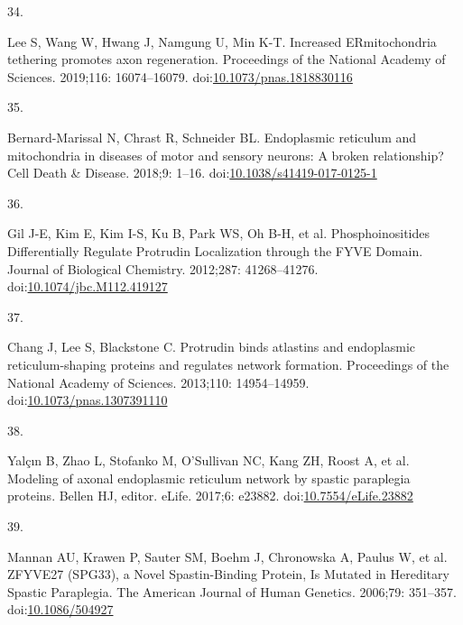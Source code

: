 \documentclass[
  12pt,
  a4paper,
]{book}
\newlength{\cslhangindent}
\newlength{\csllabelwidth}
\newlength{\cslentryspacingunit} %
\newenvironment{CSLReferences}[2] %
 {%
  \setlength{\parindent}{0pt}
  \ifodd #1
  \let\oldpar\par
  \def\par{\hangindent=\cslhangindent\oldpar}
  \fi
  \setlength{\parskip}{#2\cslentryspacingunit}
 }%
 {}
\newcommand{\CSLLeftMargin}[1]{\parbox[t]{\csllabelwidth}{#1}}
\newcommand{\CSLRightInline}[1]{\parbox[t]{\linewidth - \csllabelwidth}{#1}\break}
\begin{document}
\begin{CSLReferences}{0}{0}
\leavevmode{}%
\CSLLeftMargin{34. }%
\CSLRightInline{Lee S, Wang W, Hwang J, Namgung U, Min K-T. Increased {ER}\textendash mitochondria tethering promotes axon regeneration. Proceedings of the National Academy of Sciences. 2019;116: 16074--16079. doi:\href{https://doi.org/10.1073/pnas.1818830116}{10.1073/pnas.1818830116}}

\leavevmode{}%
\CSLLeftMargin{35. }%
\CSLRightInline{Bernard-Marissal N, Chrast R, Schneider BL. Endoplasmic reticulum and mitochondria in diseases of motor and sensory neurons: A broken relationship? Cell Death \& Disease. 2018;9: 1--16. doi:\href{https://doi.org/10.1038/s41419-017-0125-1}{10.1038/s41419-017-0125-1}}

\leavevmode{}%
\CSLLeftMargin{36. }%
\CSLRightInline{Gil J-E, Kim E, Kim I-S, Ku B, Park WS, Oh B-H, et al. Phosphoinositides {Differentially Regulate Protrudin Localization} through the {FYVE Domain}. Journal of Biological Chemistry. 2012;287: 41268--41276. doi:\href{https://doi.org/10.1074/jbc.M112.419127}{10.1074/jbc.M112.419127}}

\leavevmode{}%
\CSLLeftMargin{37. }%
\CSLRightInline{Chang J, Lee S, Blackstone C. Protrudin binds atlastins and endoplasmic reticulum-shaping proteins and regulates network formation. Proceedings of the National Academy of Sciences. 2013;110: 14954--14959. doi:\href{https://doi.org/10.1073/pnas.1307391110}{10.1073/pnas.1307391110}}

\leavevmode{}%
\CSLLeftMargin{38. }%
\CSLRightInline{Yalçın B, Zhao L, Stofanko M, O'Sullivan NC, Kang ZH, Roost A, et al. Modeling of axonal endoplasmic reticulum network by spastic paraplegia proteins. Bellen HJ, editor. eLife. 2017;6: e23882. doi:\href{https://doi.org/10.7554/eLife.23882}{10.7554/eLife.23882}}

\leavevmode{}%
\CSLLeftMargin{39. }%
\CSLRightInline{Mannan AU, Krawen P, Sauter SM, Boehm J, Chronowska A, Paulus W, et al. {ZFYVE27} ({SPG33}), a {Novel Spastin-Binding Protein}, {Is Mutated} in {Hereditary Spastic Paraplegia}. The American Journal of Human Genetics. 2006;79: 351--357. doi:\href{https://doi.org/10.1086/504927}{10.1086/504927}}


\end{CSLReferences}
\end{document}
